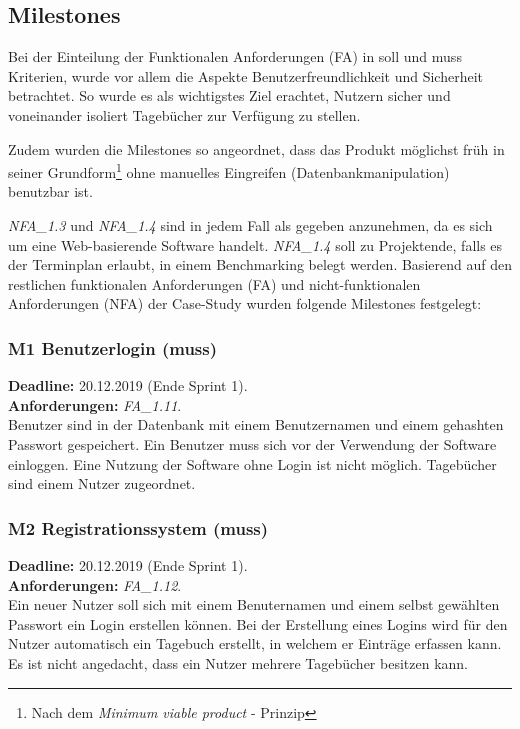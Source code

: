 \subsection{Milestones}
Bei der Einteilung der Funktionalen Anforderungen (FA) in soll und muss Kriterien, wurde vor allem die Aspekte Benutzerfreundlichkeit und Sicherheit betrachtet. So wurde es als wichtigstes Ziel erachtet, Nutzern sicher und voneinander isoliert Tagebücher zur Verfügung zu stellen.

Zudem wurden die Milestones so angeordnet, dass das Produkt möglichst früh in seiner Grundform\footnote{Nach dem \emph{Minimum viable product} - Prinzip} ohne manuelles Eingreifen (Datenbankmanipulation) benutzbar ist.

\emph{NFA\_1.3} und \emph{NFA\_1.4} sind in jedem Fall als gegeben anzunehmen, da es sich um eine Web-basierende Software handelt. \emph{NFA\_1.4} soll zu Projektende, falls es der Terminplan erlaubt, in einem Benchmarking belegt werden. Basierend auf den restlichen funktionalen Anforderungen (FA) und nicht-funktionalen Anforderungen (NFA) der Case-Study wurden folgende Milestones festgelegt:

\subsubsection{M1 Benutzerlogin (muss)}
\textbf{Deadline: } 20.12.2019 (Ende Sprint 1). \\
\textbf{Anforderungen: }\emph{FA\_1.11}.\\
Benutzer sind in der Datenbank mit einem Benutzernamen und einem gehashten Passwort gespeichert. Ein Benutzer muss sich vor der Verwendung der Software einloggen. Eine Nutzung der Software ohne Login ist nicht möglich. Tagebücher sind einem Nutzer zugeordnet.

\subsubsection{M2 Registrationssystem (muss)}
\textbf{Deadline: } 20.12.2019 (Ende Sprint 1). \\
\textbf{Anforderungen: }\emph{FA\_1.12}.\\
Ein neuer Nutzer soll sich mit einem Benuternamen und einem selbst gewählten Passwort ein Login erstellen können. Bei der Erstellung eines Logins wird für den Nutzer automatisch ein Tagebuch erstellt, in welchem er Einträge erfassen kann. Es ist nicht angedacht, dass ein Nutzer mehrere Tagebücher besitzen kann.

